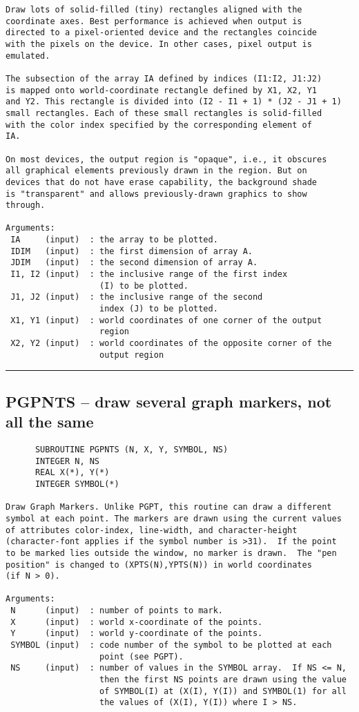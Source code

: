 {\begin{verbatim}
Draw lots of solid-filled (tiny) rectangles aligned with the
coordinate axes. Best performance is achieved when output is
directed to a pixel-oriented device and the rectangles coincide
with the pixels on the device. In other cases, pixel output is
emulated.

The subsection of the array IA defined by indices (I1:I2, J1:J2)
is mapped onto world-coordinate rectangle defined by X1, X2, Y1
and Y2. This rectangle is divided into (I2 - I1 + 1) * (J2 - J1 + 1)
small rectangles. Each of these small rectangles is solid-filled
with the color index specified by the corresponding element of 
IA.

On most devices, the output region is "opaque", i.e., it obscures
all graphical elements previously drawn in the region. But on
devices that do not have erase capability, the background shade
is "transparent" and allows previously-drawn graphics to show
through.

Arguments:
 IA     (input)  : the array to be plotted.
 IDIM   (input)  : the first dimension of array A.
 JDIM   (input)  : the second dimension of array A.
 I1, I2 (input)  : the inclusive range of the first index
                   (I) to be plotted.
 J1, J2 (input)  : the inclusive range of the second
                   index (J) to be plotted.
 X1, Y1 (input)  : world coordinates of one corner of the output
                   region
 X2, Y2 (input)  : world coordinates of the opposite corner of the
                   output region
\end{verbatim}
\hrule


\subsection*{PGPNTS -- draw several graph markers, not all the same }
\begin{verbatim}
      SUBROUTINE PGPNTS (N, X, Y, SYMBOL, NS)
      INTEGER N, NS
      REAL X(*), Y(*)
      INTEGER SYMBOL(*)

Draw Graph Markers. Unlike PGPT, this routine can draw a different
symbol at each point. The markers are drawn using the current values
of attributes color-index, line-width, and character-height
(character-font applies if the symbol number is >31).  If the point
to be marked lies outside the window, no marker is drawn.  The "pen 
position" is changed to (XPTS(N),YPTS(N)) in world coordinates
(if N > 0).

Arguments:
 N      (input)  : number of points to mark.
 X      (input)  : world x-coordinate of the points.
 Y      (input)  : world y-coordinate of the points.
 SYMBOL (input)  : code number of the symbol to be plotted at each
                   point (see PGPT).
 NS     (input)  : number of values in the SYMBOL array.  If NS <= N,
                   then the first NS points are drawn using the value
                   of SYMBOL(I) at (X(I), Y(I)) and SYMBOL(1) for all
                   the values of (X(I), Y(I)) where I > NS.


\end{verbatim}}

